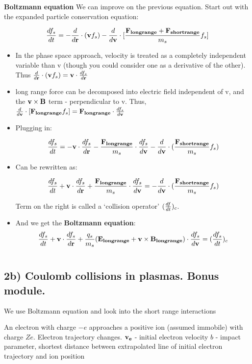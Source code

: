 \textbf{Boltzmann equation}
	We can improve on the previous equation. Start out with the expanded particle conservation equation:
	
\[ \frac{d f_s}{d t} = -\frac{d }{d \mathbf{r}} \cdot (\mathbf{v} f_s) - \frac{d }{d \mathbf{v}} \cdot [\frac{\mathbf{F_{long range}} + \mathbf{F_{short range}}}{m_s} f_s] \]

\begin{itemize}
	\item In the phase space approach, velocity is treated as a completely independent variable than v (though you could consider one as a derivative of the other). Thus $\frac{d }{d \mathbf{r}} \cdot (\mathbf{v} f_s) = \mathbf{v} \cdot	\frac{d f_s}{d \mathbf{r}}$
		\item long range force can be decomposed into electric field independent of v, and the  $\mathbf{v} \times \mathbf{B}$ term - perpendicular to v. Thus, $\frac{d }{d \mathbf{v}} \cdot [\mathbf{F_{long range}} f_s] = \mathbf{F_{long range}}\cdot\frac{d f_s}{d \mathbf{v}} $
	\item Plugging in:
	
	\[ \frac{d f_s}{d t} = -\mathbf{v}\cdot\frac{d f_s}{d \mathbf{r}} - \frac{\mathbf{F_{long range}}}{m_s} \cdot \frac{d f_s}{d \mathbf{v}} - \frac{d }{d \mathbf{v}} \cdot (\frac{\mathbf{F_{short range}}}{m_s} f_s) \]
	\item Can be rewritten as:
	
	\[ \frac{d f_s}{d t} +\mathbf{v}\cdot\frac{d f_s}{d \mathbf{r}} + \frac{\mathbf{F_{long range}}}{m_s} \cdot \frac{d f_s}{d \mathbf{v}} = - \frac{d }{d \mathbf{v}} \cdot (\frac{\mathbf{F_{short range}}}{m_s} f_s) \]
	
	Term on the right is called a `collision operator' $(\frac{d f}{d t})_c$.	
	
\item And we get the \textbf{Boltzmann equation}:
	\[ \frac{d f_s}{d t} +\mathbf{v}\cdot\frac{d f_s}{d \mathbf{r}} + \frac{q_s}{m_s}(\mathbf{E_{long range}} + \mathbf{v} \times \mathbf{B_{long range}}) \cdot \frac{d f_s}{d \mathbf{v}} = (\frac{d f_s}{d t})_c \]
\end {itemize}

\[   \]

\subsection{2b) Coulomb collisions in plasmas. Bonus module.}
We use Boltzmann equation and look into the short range interactions

An electron with charge $-e$ approaches a positive ion (assumed immobile) with charge $Ze$. Electron trajectory changes.
$\mathbf{v_e}$ - initial electron velocity
$b$ - impact parameter, shortest distance between extrapolated line of initial electron trajectory and ion position

